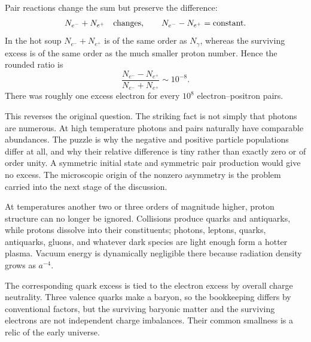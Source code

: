 \begin{classroomqa}
\end{classroomqa}

Pair reactions change the sum but preserve the difference:
\begin{equation}
N_{e^-}+N_{e^+}\quad\hbox{changes},
\qquad
N_{e^-}-N_{e^+}=\hbox{constant}.
\label{eq:c07-pair-invariants}
\end{equation}
In the hot soup \(N_{e^-}+N_{e^+}\) is of the same order as \(N_\gamma\), whereas the surviving excess is of the same order as the much smaller proton number. Hence the rounded ratio is
\begin{equation}
\boxed{
\frac{N_{e^-}-N_{e^+}}
{N_{e^-}+N_{e^+}}
\sim10^{-8}
}.
\label{eq:c07-asymmetry}
\end{equation}
There was roughly one excess electron for every \(10^8\) electron--positron pairs.

This reverses the original question. The striking fact is not simply that photons are numerous. At high temperature photons and pairs naturally have comparable abundances. The puzzle is why the negative and positive particle populations differ at all, and why their relative difference is tiny rather than exactly zero or of order unity. A symmetric initial state and symmetric pair production would give no excess. The microscopic origin of the nonzero asymmetry is the problem carried into the next stage of the discussion.

At temperatures another two or three orders of magnitude higher, proton structure can no longer be ignored. Collisions produce quarks and antiquarks, while protons dissolve into their constituents; photons, leptons, quarks, antiquarks, gluons, and whatever dark species are light enough form a hotter plasma. Vacuum energy is dynamically negligible there because radiation density grows as \(a^{-4}\).

The corresponding quark excess is tied to the electron excess by overall charge neutrality. Three valence quarks make a baryon, so the bookkeeping differs by conventional factors, but the surviving baryonic matter and the surviving electrons are not independent charge imbalances. Their common smallness is a relic of the early universe.

